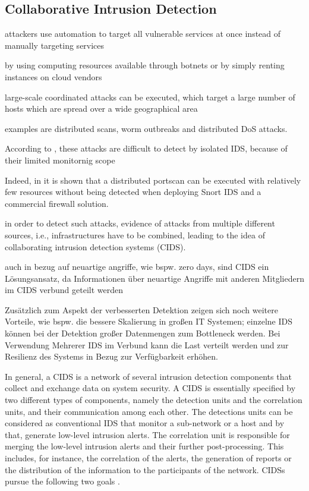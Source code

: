 \subsection{Collaborative Intrusion Detection}

attackers use automation to target all vulnerable services at once instead of manually targeting services \cite{savage2005}

by using computing resources available through botnets or by simply renting instances on cloud vendors

large-scale coordinated attacks can be executed, which target a large number of hosts which are spread over a wide geographical area \cite{Zhou2010}

examples are distributed scans, worm outbreaks and distributed DoS attacks.

According to \cite{Zhou2010}, these attacks are difficult to detect by isolated IDS, because of their limited monitornig scope

Indeed, in \cite{riquet2012large} it is shown that a distributed portscan can be executed with relatively few resources without being detected when deploying Snort IDS and a commercial firewall solution.

in order to detect such attacks, evidence of attacks from multiple different sources, i.e., infrastructures have to be combined, leading to the idea of collaborating intrusion detection systems (CIDS).

auch in bezug auf neuartige angriffe, wie bspw. zero days, sind CIDS ein Lösungsansatz, da Informationen über neuartige Angriffe mit anderen Mitgliedern im CIDS verbund geteilt werden

Zusätzlich zum Aspekt der verbesserten Detektion zeigen sich noch weitere Vorteile, wie bspw. die bessere Skalierung in großen IT Systemen; einzelne IDS können bei der Detektion großer Datenmengen zum Bottleneck werden. Bei Verwendung Mehrerer IDS im Verbund kann die Last verteilt werden und zur Resilienz des Systems in Bezug zur Verfügbarkeit erhöhen.

 In general, a CIDS is a network of several intrusion detection components that collect and exchange data on system security. A CIDS is essentially specified by two different types of components, namely the detection units and the correlation units, and their communication among each other. The detections units can be considered as conventional IDS that monitor a sub-network or a host and by that, generate low-level intrusion alerts. The correlation unit is responsible for merging the low-level intrusion alerts and their further post-processing. This includes, for instance, the correlation of the alerts, the generation of reports or the distribution of the information to the participants of the network. CIDSs pursue the following two goals \cite[24]{vasilomanolakis_collaborative_2016}.


